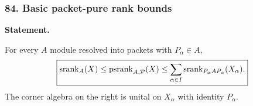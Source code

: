 \subsubsection*{84. Basic packet-pure rank bounds}
\label{rec:PSC-I-P-PACKET-PURE-RANK-BOUNDS}
\textbf{Statement.}\par
For every $A$ module resolved into packets with $P_\alpha\in A$,
\[
\boxed{
\operatorname{srank}_A(X)
\leq
\operatorname{psrank}_{A,\mathcal P}(X)
\leq
\sum_{\alpha\in I}
\operatorname{srank}_{P_\alpha A P_\alpha}(X_\alpha).
}
\]
The corner algebra on the right is unital on $X_\alpha$ with identity $P_\alpha$.


